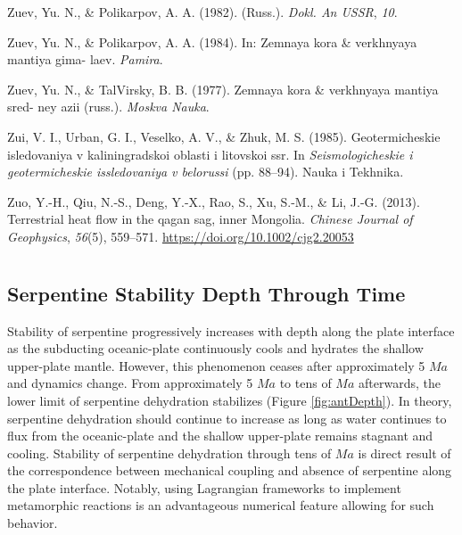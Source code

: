 \begin{CSLReferences}{1}{1}
\leavevmode{}%
Zuev, Yu. N., \& Polikarpov, A. A. (1982). (Russ.). \emph{Dokl. An USSR}, \emph{10}.

\leavevmode{}%
Zuev, Yu. N., \& Polikarpov, A. A. (1984). In: Zemnaya kora \& verkhnyaya mantiya gima- laev. \emph{Pamira}.

\leavevmode{}%
Zuev, Yu. N., \& TalVirsky, B. B. (1977). Zemnaya kora \& verkhnyaya mantiya sred- ney azii (russ.). \emph{Moskva Nauka}.

\leavevmode{}%
Zui, V. I., Urban, G. I., Veselko, A. V., \& Zhuk, M. S. (1985). Geotermicheskie isledovaniya v kaliningradskoi oblasti i litovskoi ssr. In \emph{Seismologicheskie i geotermicheskie issledovaniya v belorussi} (pp. 88--94). Nauka i Tekhnika.

\leavevmode{}%
Zuo, Y.-H., Qiu, N.-S., Deng, Y.-X., Rao, S., Xu, S.-M., \& Li, J.-G. (2013). Terrestrial heat flow in the qagan sag, inner {Mongolia}. \emph{Chinese Journal of Geophysics}, \emph{56}(5), 559--571. \url{https://doi.org/10.1002/cjg2.20053}

\end{CSLReferences}

\cleardoublepage

\hypertarget{appendix-appendix}{%
\appendix}



\hypertarget{section}{%
\chapter{}\label{section}}

\hypertarget{antDepth}{%
\section{Serpentine Stability Depth Through Time}\label{antDepth}}

Stability of serpentine progressively increases with depth along the plate interface as the subducting oceanic-plate continuously cools and hydrates the shallow upper-plate mantle. However, this phenomenon ceases after approximately 5 \(Ma\) and dynamics change. From approximately 5 \(Ma\) to tens of \(Ma\) afterwards, the lower limit of serpentine dehydration stabilizes (Figure \ref{fig:antDepth}). In theory, serpentine dehydration should continue to increase as long as water continues to flux from the oceanic-plate and the shallow upper-plate remains stagnant and cooling. Stability of serpentine dehydration through tens of \(Ma\) is direct result of the correspondence between mechanical coupling and absence of serpentine along the plate interface. Notably, using Lagrangian frameworks to implement metamorphic reactions is an advantageous numerical feature allowing for such behavior.

